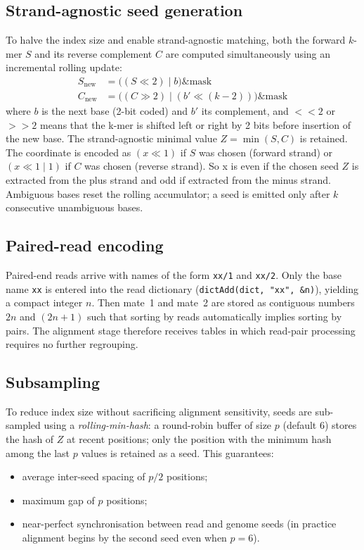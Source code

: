 \documentclass[11pt]{article}
\begin{document}
\subsection{Strand-agnostic seed generation}
\label{sec:strand_agnostic}

To halve the index size and enable strand-agnostic matching, both the
forward $k$-mer $S$ and its reverse complement $C$ are computed
simultaneously using an incremental rolling update:
\begin{align}
  S_{\text{new}} &= \bigl((S \ll 2) \mid b\bigr) \mathbin{\&} \text{mask} \\
  C_{\text{new}} &= \bigl((C \gg 2) \mid (b' \ll (k-2))\bigr) \mathbin{\&} \text{mask}
\end{align}
where $b$ is the next base (2-bit coded) and $b'$ its complement,
and $<<2$ or $>>2$ means that the k-mer is shifted left or right
by 2 bits before insertion of the new base.
The strand-agnostic minimal value $Z = \min(S, C)$ is retained.
The coordinate is encoded as $(x \ll 1)$ if $S$ was chosen (forward
strand) or $(x \ll 1 \mid 1)$ if $C$ was chosen (reverse strand).
So x is even if the chosen seed $Z$ is extracted from the plus strand and
odd if extracted from the minus strand.
Ambiguous bases reset the rolling accumulator; a seed is emitted only
after $k$ consecutive unambiguous bases.

\subsection{Paired-read encoding}
\label{sec:paired_encoding}

Paired-end reads arrive with names of the form \texttt{xx/1} and
\texttt{xx/2}.
Only the base name \texttt{xx} is entered into the read dictionary
(\texttt{dictAdd(dict, "xx", \&n)}), yielding a compact integer $n$.
Then mate~1 and mate~2 are stored as contiguous numbers $2n$ and $(2n+1)$
such that sorting by reads automatically implies sorting by pairs.
The alignment stage therefore receives tables in which read-pair
processing requires no further regrouping.

\subsection{Subsampling}
\label{sec:subsampling}

To reduce index size without sacrificing alignment sensitivity, seeds
are sub-sampled using a \emph{rolling-min-hash}: a round-robin buffer
of size $p$ (default 6) stores the hash of $Z$ at recent positions;
only the position with the minimum hash among the last $p$ values is
retained as a seed.
This guarantees:
\begin{itemize}
  \item average inter-seed spacing of $p/2$ positions;
  \item maximum gap of $p$ positions;
  \item near-perfect synchronisation between read and genome seeds
        (in practice alignment begins by the second seed even when $p = 6$).
\end{itemize}
\end{document}
